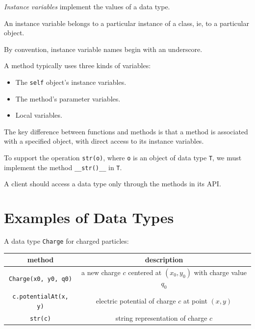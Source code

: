 \documentclass[8pt,a4paper,compress,handout]{beamer}
\begin{document}
\begin{frame}[fragile]
\emph{Instance variables} implement the values of a data type. 

\bigskip

An instance variable belongs to a particular instance of a class, ie, to a particular object.  

\bigskip

By convention, instance variable names begin with an underscore.

\bigskip

A method typically uses three kinds of variables:
\begin{itemize}
\item The \lstinline{self} object's instance variables.

\item The method's parameter variables.

\item Local variables.
\end{itemize}

\bigskip

The key difference between functions and methods is that a method is associated with a specified object, with direct access to its instance variables.

\bigskip

To support the operation \lstinline{str(o)}, where \lstinline{o} is an object of data type \lstinline{T}, we must implement the method \lstinline{__str()__} in \lstinline{T}.

\bigskip

A client should access a data type only through the methods in its API.
\end{frame}

\section{Examples of Data Types}

\begin{frame}[fragile]
A data type \lstinline{Charge} for charged particles:
\begin{center}
\begin{tabular}{cc}
method & description \\ \hline
\lstinline$Charge(x0, y0, q0)$ & a new charge $c$ centered at $(x_0, y_0)$ with charge value $q_0$ \\
\lstinline$c.potentialAt(x, y)$ & electric potential of charge $c$ at point $(x, y)$ \\
\lstinline$str(c)$ & string representation of charge $c$
\end{tabular} 
\end{center}
\end{frame}
\end{document}
